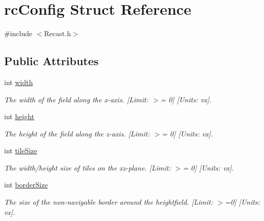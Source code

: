 \hypertarget{structrcConfig}{}\section{rc\+Config Struct Reference}
\label{structrcConfig}


{\ttfamily \#include $<$Recast.\+h$>$}

\subsection*{Public Attributes}
\begin{DoxyCompactItemize}
\item 
\mbox{\label{structrcConfig_aa870882b1addeb37535185740838eb32}} 
int \hyperlink{structrcConfig_aa870882b1addeb37535185740838eb32}{width}
\begin{DoxyCompactList}\small\item\em The width of the field along the x-\/axis. \mbox{[}Limit\+: $>$= 0\mbox{]} \mbox{[}Units\+: vx\mbox{]}. \end{DoxyCompactList}\item 
\mbox{\label{structrcConfig_a25cdb5fcddc1d2813eca2462f60c13d1}} 
int \hyperlink{structrcConfig_a25cdb5fcddc1d2813eca2462f60c13d1}{height}
\begin{DoxyCompactList}\small\item\em The height of the field along the z-\/axis. \mbox{[}Limit\+: $>$= 0\mbox{]} \mbox{[}Units\+: vx\mbox{]}. \end{DoxyCompactList}\item 
\mbox{\label{structrcConfig_a71383d155438aa287ff2af72f70b45b5}} 
int \hyperlink{structrcConfig_a71383d155438aa287ff2af72f70b45b5}{tile\+Size}
\begin{DoxyCompactList}\small\item\em The width/height size of tile\textquotesingle{}s on the xz-\/plane. \mbox{[}Limit\+: $>$= 0\mbox{]} \mbox{[}Units\+: vx\mbox{]}. \end{DoxyCompactList}\item 
\mbox{\label{structrcConfig_a582bdbc924c92e10b900f2f033e2bd15}} 
int \hyperlink{structrcConfig_a582bdbc924c92e10b900f2f033e2bd15}{border\+Size}
\begin{DoxyCompactList}\small\item\em The size of the non-\/navigable border around the heightfield. \mbox{[}Limit\+: $>$=0\mbox{]} \mbox{[}Units\+: vx\mbox{]}. \end{DoxyCompactList}\item 

\end{DoxyCompactItemize}
